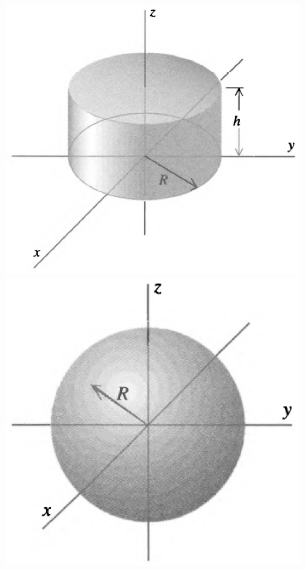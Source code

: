 \documentclass[11pt,letterpaper,boxed]{hmcpset}
\begin{document}
\begin{problem}[Schey II-10]
\begin{center}
			\includegraphics[scale=0.25]{II-10b.png}
			\includegraphics[scale=0.25]{II-10c.png}

\end{center}
\end{problem}
\end{document}

